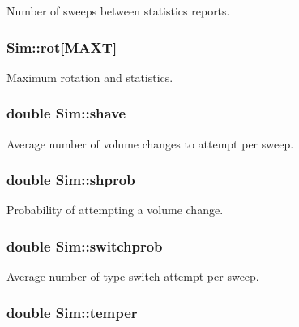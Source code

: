 Number of sweeps between statistics reports. 

\hypertarget{class_sim_a434d5b10fc6a3bf6fec51eaaf9ff83cb}{
\subsubsection[{rot}]{ Sim\+::rot\mbox{[}{\bf M\+A\+X\+T}\mbox{]}}}\label{class_sim_a434d5b10fc6a3bf6fec51eaaf9ff83cb}


Maximum rotation and statistics. 

\hypertarget{class_sim_a9357f4ec28e50a0fab9df1536c7f4d7e}{
\subsubsection[{shave}]{\setlength{\rightskip}{0pt plus 5cm}double Sim\+::shave}}\label{class_sim_a9357f4ec28e50a0fab9df1536c7f4d7e}


Average number of volume changes to attempt per sweep. 

\hypertarget{class_sim_a65b96c98b4444057b20d47594298ccde}{
\subsubsection[{shprob}]{\setlength{\rightskip}{0pt plus 5cm}double Sim\+::shprob}}\label{class_sim_a65b96c98b4444057b20d47594298ccde}


Probability of attempting a volume change. 

\hypertarget{class_sim_a71dacb1d9da362be221fa89a27dc47bc}{
\subsubsection[{switchprob}]{\setlength{\rightskip}{0pt plus 5cm}double Sim\+::switchprob}}\label{class_sim_a71dacb1d9da362be221fa89a27dc47bc}


Average number of type switch attempt per sweep. 

\hypertarget{class_sim_aa181060fddbb0694234034de7642f56a}{
\subsubsection[{temper}]{\setlength{\rightskip}{0pt plus 5cm}double Sim\+::temper}}\label{class_sim_aa181060fddbb0694234034de7642f56a}


